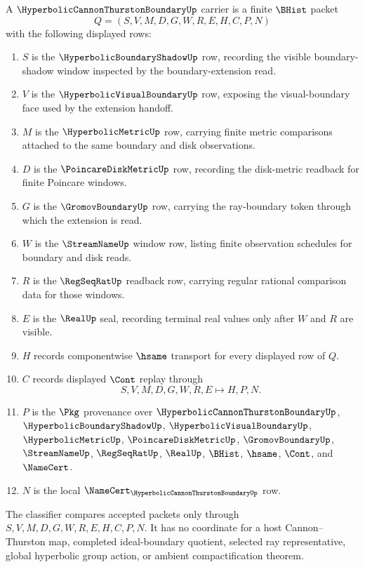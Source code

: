 \begin{definition}
\label{def:hyperbolic-cannon-thurston-boundary-carrier}
A $\HyperbolicCannonThurstonBoundaryUp$ carrier is a finite $\BHist$ packet
$$
Q=(S,V,M,D,G,W,R,E,H,C,P,N)
$$
with the following displayed rows:
\begin{enumerate}
\item $S$ is the $\HyperbolicBoundaryShadowUp$ row, recording the visible boundary-shadow window inspected by the boundary-extension read.
\item $V$ is the $\HyperbolicVisualBoundaryUp$ row, exposing the visual-boundary face used by the extension handoff.
\item $M$ is the $\HyperbolicMetricUp$ row, carrying finite metric comparisons attached to the same boundary and disk observations.
\item $D$ is the $\PoincareDiskMetricUp$ row, recording the disk-metric readback for finite Poincare windows.
\item $G$ is the $\GromovBoundaryUp$ row, carrying the ray-boundary token through which the extension is read.
\item $W$ is the $\StreamNameUp$ window row, listing finite observation schedules for boundary and disk reads.
\item $R$ is the $\RegSeqRatUp$ readback row, carrying regular rational comparison data for those windows.
\item $E$ is the $\RealUp$ seal, recording terminal real values only after $W$ and $R$ are visible.
\item $H$ records componentwise $\hsame$ transport for every displayed row of $Q$.
\item $C$ records displayed $\Cont$ replay through
$$
S,V,M,D,G,W,R,E \longmapsto H,P,N .
$$
\item $P$ is the $\Pkg$ provenance over $\HyperbolicCannonThurstonBoundaryUp$, $\HyperbolicBoundaryShadowUp$, $\HyperbolicVisualBoundaryUp$, $\HyperbolicMetricUp$, $\PoincareDiskMetricUp$, $\GromovBoundaryUp$, $\StreamNameUp$, $\RegSeqRatUp$, $\RealUp$, $\BHist$, $\hsame$, $\Cont$, and $\NameCert$.
\item $N$ is the local $\NameCert_{\HyperbolicCannonThurstonBoundaryUp}$ row.
\end{enumerate}
The classifier compares accepted packets only through $S,V,M,D,G,W,R,E,H,C,P,N$. It has no coordinate for a host Cannon--Thurston map, completed ideal-boundary quotient, selected ray representative, global hyperbolic group action, or ambient compactification theorem.
\end{definition}


